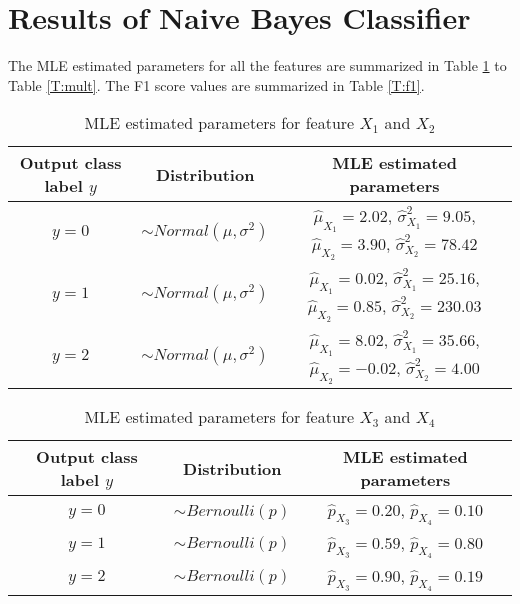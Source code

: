 \documentclass[12pt, a4paper, twoside]{article}
\begin{document}
\section{Results of Naive Bayes Classifier}
The MLE estimated parameters for all the features are summarized in Table \ref{T:normal} to Table \ref{T:mult}.
The F1 score values are summarized in Table \ref{T:f1}.
{
	\renewcommand{\arraystretch}{2}
	\begin{table}[p]
		\begin{center}
			\begin{tabular}{c c c}
				\hline
				Output class label $y$ & Distribution & MLE estimated parameters \\ \hline
				$y = 0$& $\sim Normal(\mu, \sigma^2)$& $\hat{\mu}_{X_1} = 2.02$, $\hat{\sigma}_{X_1}^2 = 9.05$, $\hat{\mu}_{X_2} = 3.90$, $\hat{\sigma}_{X_2}^2 = 78.42$ \\ \hline
				$y = 1$& $\sim Normal(\mu, \sigma^2)$& $\hat{\mu}_{X_1} = 0.02$, $\hat{\sigma}_{X_1}^2 = 25.16$, $\hat{\mu}_{X_2} = 0.85 $, $\hat{\sigma}_{X_2}^2 = 230.03$ \\ \hline
				$y = 2$& $\sim Normal(\mu, \sigma^2)$& $\hat{\mu}_{X_1} = 8.02$, $\hat{\sigma}_{X_1}^2 = 35.66$, $\hat{\mu}_{X_2} = -0.02 $, $\hat{\sigma}_{X_2}^2 = 4.00$ \\ \hline
			\end{tabular}
			\caption{MLE estimated parameters for feature $X_1$ and $X_2$}\label{T:normal}
		\end{center}
	\end{table}
}
{
	\renewcommand{\arraystretch}{2}
	\begin{table}[p]
		\begin{center}
			\begin{tabular}{c c c}
				\hline
				Output class label $y$ & Distribution & MLE estimated parameters  \\ \hline
				$y = 0$& $\sim Bernoulli(p)$& $\hat{p}_{X_3} = 0.20$, $\hat{p}_{X_4} = 0.10$ \\ \hline
				$y = 1$& $\sim Bernoulli(p)$& $\hat{p}_{X_3} = 0.59$, $\hat{p}_{X_4} = 0.80$ \\ \hline
				$y = 2$& $\sim Bernoulli(p)$& $\hat{p}_{X_3} = 0.90$, $\hat{p}_{X_4} = 0.19$ \\ \hline
			\end{tabular}
			\caption{MLE estimated parameters for feature $X_3$ and $X_4$}\label{T:ber}
		\end{center}
	\end{table}
}
\end{document}
